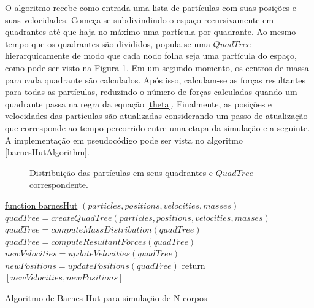 \documentclass[rel_mlp]{iiufrgs}
\begin{document}
O algoritmo recebe como entrada uma lista de partículas com suas posições e suas velocidades. Começa-se subdivindindo o espaço recursivamente em quadrantes até que haja no máximo uma partícula por quadrante. Ao mesmo tempo que os quadrantes são divididos, popula-se uma $QuadTree$ hierarquicamente de modo que cada nodo folha seja uma partícula do espaço, como pode ser visto na Figura \ref{fig:quadtree.jpg}. Em um segundo momento, os centros de massa para cada quadrante são calculados. Após isso, calculam-se as forças resultantes para todas as partículas, reduzindo o número de forças calculadas quando um quadrante passa na regra da equação \eqref{theta}. Finalmente, as posições e velocidades das partículas são atualizadas considerando um passo de atualização que corresponde ao tempo percorrido entre uma etapa da simulação e a seguinte. A implementação em pseudocódigo pode ser vista no algoritmo \ref{barnesHutAlgorithm}.


\begin{figure}[htb]
    \centering
    \caption{Distribuição das partículas em seus quadrantes e $QuadTree$ correspondente.}
    \label{fig:quadtree.jpg}
\end{figure}


\begin{algorithm}
	\label{barnesHutAlgorithm}

    \underline{function barnesHut} $(particles, positions, velocities, masses)$\;
    $quadTree = createQuadTree(particles, positions, velocities, masses)$\;
    $quadTree = computeMassDistribution(quadTree)$\;
    $quadTree = computeResultantForces(quadTree)$\;
    $newVelocities = updateVelocities(quadTree)$\;
    $newPositions = updatePositions(quadTree)$\;
    return $[newVelocities, newPositions]$\;
    \caption{Algoritmo de Barnes-Hut para simulação de N-corpos}
\end{algorithm}
\end{document}
